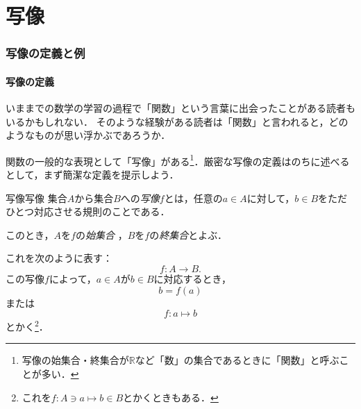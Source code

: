 \part{写像}

\section{写像の定義と例}

\subsection{写像の定義}

いままでの数学の学習の過程で「関数」という言葉に出会ったことがある読者もいるかもしれない．
そのような経験がある読者は「関数」と言われると，どのようなものが思い浮かぶであろうか．

関数の一般的な表現として「写像」がある\footnote{写像の始集合・終集合が$\mathbb{R}$など「数」の集合であるときに「関数」と呼ぶことが多い．}．厳密な写像の定義はのちに述べるとして，まず簡潔な定義を提示しよう．

\begin{definition}{写像}{写像}
  集合$A$から集合$B$への\emph{写像}$f$とは，任意の$a \in A$に対して，$b \in B$をただひとつ対応させる規則のことである．

  このとき，$A$を$f$の\emph{始集合} ，$B$を$f$の\emph{終集合}とよぶ．

  これを次のように表す：
  \[
    f \colon A \to B.
  \]
  この写像$f$によって，$a \in A$が$b \in B$に対応するとき，
  \[
    b=f(a)
  \]
  または
  \[
    f \colon a \mapsto b
  \]
  とかく\footnote{これを$ f \colon A \ni a \mapsto b \in B$とかくときもある．}．
\end{definition}

